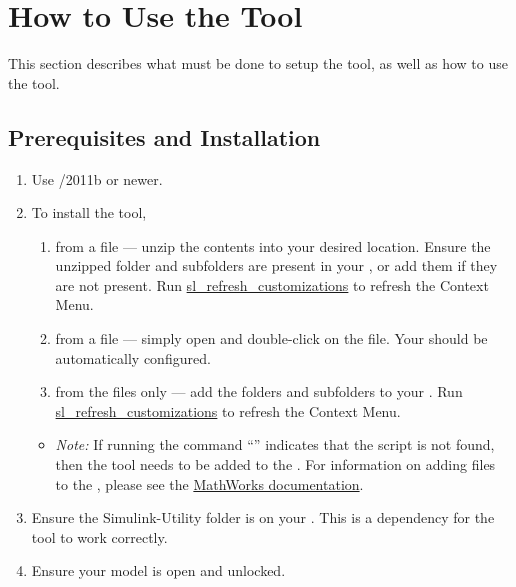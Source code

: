 \documentclass{article}
\begin{document}
\section{How to Use the Tool}
This section describes what must be done to setup the tool, as well as how to use the tool.

\subsection{Prerequisites and Installation}

\begin{enumerate}
	\item Use \Matlab/\Simulink 2011b or newer.
	\item To install the tool,
	\begin{enumerate}
		\item from a  file --- unzip the contents into your desired location. Ensure the unzipped folder and subfolders are present in your \mpath, or add them if they are not present. Run \href{https://www.mathworks.com/help/simulink/ug/registering-customizations.html}{sl\_refresh\_customizations} to refresh the Context Menu. 
		\item from a  file --- simply open \Matlab and double-click on the file. Your \mpath should be automatically configured.
		\item from the files only --- add the folders and subfolders to your \mpath. Run \href{https://www.mathworks.com/help/simulink/ug/registering-customizations.html}{sl\_refresh\_customizations} to refresh the Context Menu.
	\end{enumerate}
	\begin{itemize}
		\item \textit{Note:} If running the command ``'' indicates that the script is not found, then the tool needs to be added to the \mpath.
		For information on adding files to the \mpath, please see the \href{https://www.mathworks.com/help/matlab/matlab_env/add-remove-or-reorder-folders-on-the-search-path.html}{MathWorks documentation}.
	\end{itemize}
	\item Ensure the Simulink-Utility folder is on your \mpath. This is a dependency for the tool to work correctly.
	\item Ensure your model is open and unlocked.
\end{enumerate}
\end{document}
